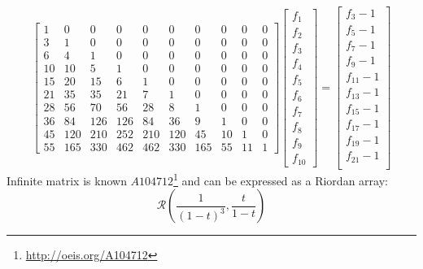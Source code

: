 \begin{displaymath}
    \left[
    \begin{array}{cccccccccc}
        1 & 0 & 0 & 0 & 0 & 0 & 0 & 0 & 0 & 0\\
        3 & 1 & 0 & 0 & 0 & 0 & 0 & 0 & 0 & 0\\
        6 & 4 & 1 & 0 & 0 & 0 & 0 & 0 & 0 & 0\\
        10 & 10 & 5 & 1 & 0 & 0 & 0 & 0 & 0 & 0\\
        15 & 20 & 15 & 6 & 1 & 0 & 0 & 0 & 0 & 0\\
        21 & 35 & 35 & 21 & 7 & 1 & 0 & 0 & 0 & 0\\
        28 & 56 & 70 & 56 & 28 & 8 & 1 & 0 & 0 & 0\\
        36 & 84 & 126 & 126 & 84 & 36 & 9 & 1 & 0 & 0\\
        45 & 120 & 210 & 252 & 210 & 120 & 45 & 10 & 1 & 0\\
        55 & 165 & 330 & 462 & 462 & 330 & 165 & 55 & 11 & 1
        \end{array}\right]  \left[
        \begin{array}{c}
            f_{1}\\
            f_{2}\\
            f_{3}\\
            f_{4}\\
            f_{5}\\
            f_{6}\\
            f_{7}\\
            f_{8}\\
            f_{9}\\
            f_{10}\end{array}\right] = \left[
        \begin{array}{c}
            f_{3} - 1\\
            f_{5} - 1\\
            f_{7} - 1\\
            f_{9} - 1\\
            f_{11} - 1\\
            f_{13} - 1\\
            f_{15} - 1\\
            f_{17} - 1\\
            f_{19} - 1\\
            f_{21} - 1\\
            \end{array}\right]
\end{displaymath}
Infinite matrix is known $A104712$\footnote{\url{http://oeis.org/A104712}}
and can be expressed as a Riordan array:
\begin{displaymath}
    \mathcal{R}\left(\frac{1}{(1-t)^3}, \frac{t}{1-t}\right)
\end{displaymath}

